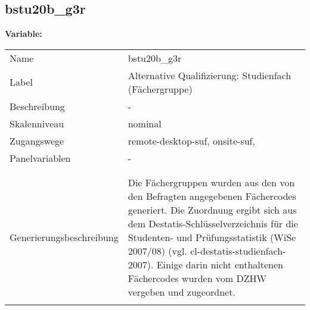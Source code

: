 	
	
	\subsection{bstu20b\_g3r}
	\label{subSection:bstu20b_g3r}

	\noindent\textbf{Variable:}\\
		\begin{tabular}{lL{11.3cm}}
			\label{tableVariable:bstu20b_g3r}
			Name & bstu20b\_g3r \\
			Label & Alternative Qualifizierung: Studienfach (Fächergruppe) \\
			Beschreibung & - \\
			Skalenniveau & nominal \\
			Zugangswege &
				remote-desktop-suf,
				onsite-suf,
 \\
			Panelvariablen & -
			 \\
			 \\
 \\
					Generierungsbeschreibung & Die Fächergruppen wurden aus den von den Befragten angegebenen Fächercodes generiert. Die Zuordnung ergibt sich aus dem Destatis-Schlüsselverzeichnis für die Studenten- und Prüfungsstatistik (WiSe 2007/08) (vgl. cl-destatis-studienfach-2007).  Einige darin nicht enthaltenen Fächercodes wurden vom DZHW vergeben und zugeordnet. 
				 \\	
			 \\
		\end{tabular}






